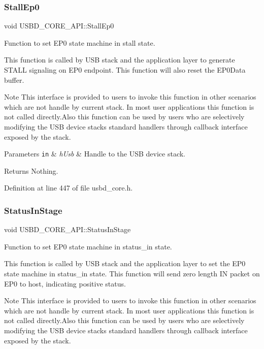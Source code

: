 \subsubsection{\texorpdfstring{Stall\+Ep0}{StallEp0}}
{\footnotesize\ttfamily void U\+S\+B\+D\+\_\+\+C\+O\+R\+E\+\_\+\+A\+P\+I\+::\+Stall\+Ep0}

Function to set E\+P0 state machine in stall state.

This function is called by U\+SB stack and the application layer to generate S\+T\+A\+LL signaling on E\+P0 endpoint. This function will also reset the E\+P0\+Data buffer. ~\newline
\begin{DoxyNote}{Note}
This interface is provided to users to invoke this function in other scenarios which are not handle by current stack. In most user applications this function is not called directly.\+Also this function can be used by users who are selectively modifying the U\+SB device stack\textquotesingle{}s standard handlers through callback interface exposed by the stack.
\end{DoxyNote}

\begin{DoxyParams}[1]{Parameters}
\mbox{\tt in}  & {\em h\+Usb} & Handle to the U\+SB device stack. \\
\hline
\end{DoxyParams}
\begin{DoxyReturn}{Returns}
Nothing. 
\end{DoxyReturn}


Definition at line 447 of file usbd\+\_\+core.\+h.

\mbox{\label{struct_u_s_b_d___c_o_r_e___a_p_i_a9b57a8360ef4b3acd63ede5773813b36}} 
\subsubsection{\texorpdfstring{Status\+In\+Stage}{StatusInStage}}
{\footnotesize\ttfamily void U\+S\+B\+D\+\_\+\+C\+O\+R\+E\+\_\+\+A\+P\+I\+::\+Status\+In\+Stage}

Function to set E\+P0 state machine in status\+\_\+in state.

This function is called by U\+SB stack and the application layer to set the E\+P0 state machine in status\+\_\+in state. This function will send zero length IN packet on E\+P0 to host, indicating positive status. ~\newline
\begin{DoxyNote}{Note}
This interface is provided to users to invoke this function in other scenarios which are not handle by current stack. In most user applications this function is not called directly.\+Also this function can be used by users who are selectively modifying the U\+SB device stack\textquotesingle{}s standard handlers through callback interface exposed by the stack.
\end{DoxyNote}

